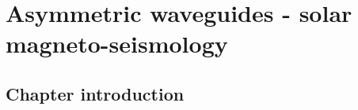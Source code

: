 \documentclass[12pt]{../style-files/ociamthesis}
\begin{document}
\baselineskip=18pt

\setcounter{secnumdepth}{3}
\setcounter{tocdepth}{3}

\setcounter{chapter}{3}


\chapter{Asymmetric waveguides - solar magneto-seismology}
\label{chap: SMS}

\section{Chapter introduction}
\label{sec: SMS intro}
\end{document}
